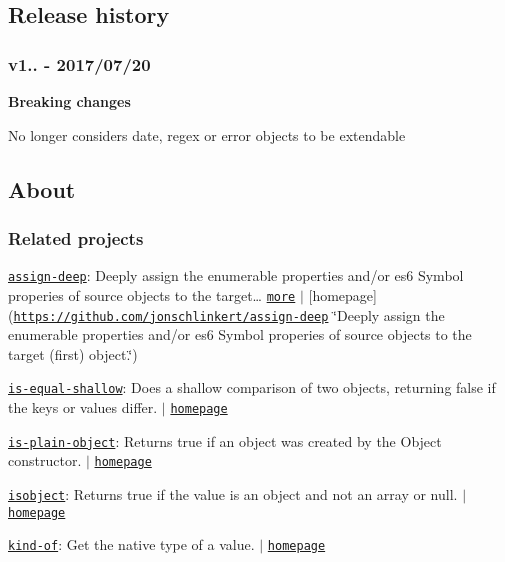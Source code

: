 \subsection*{Release history}

\subsubsection*{v1.. -\/ 2017/07/20}

{\bfseries Breaking changes}


\begin{DoxyItemize}
\item No longer considers date, regex or error objects to be extendable
\end{DoxyItemize}

\subsection*{About}

\subsubsection*{Related projects}


\begin{DoxyItemize}
\item \href{https://www.npmjs.com/package/assign-deep}{\tt assign-\/deep}\+: Deeply assign the enumerable properties and/or es6 Symbol properies of source objects to the target… \href{https://github.com/jonschlinkert/assign-deep}{\tt more} $\vert$ \mbox{[}homepage\mbox{]}(\href{https://github.com/jonschlinkert/assign-deep}{\tt https\+://github.\+com/jonschlinkert/assign-\/deep} \char`\"{}\+Deeply assign the enumerable properties and/or es6 Symbol properies of source objects to the target (first) object.\char`\"{})
\item \href{https://www.npmjs.com/package/is-equal-shallow}{\tt is-\/equal-\/shallow}\+: Does a shallow comparison of two objects, returning false if the keys or values differ. $\vert$ \href{https://github.com/jonschlinkert/is-equal-shallow}{\tt homepage}
\item \href{https://www.npmjs.com/package/is-plain-object}{\tt is-\/plain-\/object}\+: Returns true if an object was created by the {\ttfamily Object} constructor. $\vert$ \href{https://github.com/jonschlinkert/is-plain-object}{\tt homepage}
\item \href{https://www.npmjs.com/package/isobject}{\tt isobject}\+: Returns true if the value is an object and not an array or null. $\vert$ \href{https://github.com/jonschlinkert/isobject}{\tt homepage}
\item \href{https://www.npmjs.com/package/kind-of}{\tt kind-\/of}\+: Get the native type of a value. $\vert$ \href{https://github.com/jonschlinkert/kind-of}{\tt homepage}
\end{DoxyItemize}

